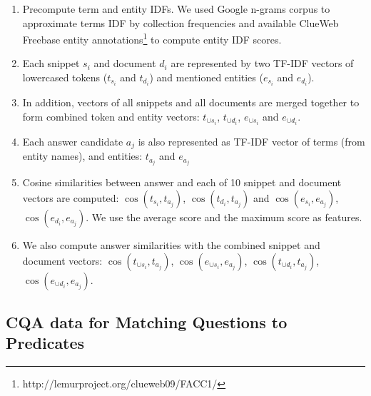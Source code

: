 \begin{enumerate}[noitemsep,topsep=0pt]
\item Precompute term and entity IDFs. We used Google n-grams corpus to approximate terms IDF by collection frequencies and available ClueWeb Freebase entity annotations\footnote{http://lemurproject.org/clueweb09/FACC1/} to compute entity IDF scores.
\item Each snippet $s_i$ and document $d_i$ are represented by two TF-IDF vectors of lowercased tokens ($t_{s_i}$ and $t_{d_i}$) and mentioned entities ($e_{s_i}$ and $e_{d_i}$).
\item In addition, vectors of all snippets and all documents are merged together to form combined token and entity vectors: $t_{\cup s_i}$, $t_{\cup d_i}$, $e_{\cup s_i}$ and $e_{\cup d_i}$.
\item Each answer candidate $a_j$ is also represented as TF-IDF vector of terms (from entity names), and entities: $t_{a_j}$ and $e_{a_j}$
\item Cosine similarities between answer and each of 10 snippet and document vectors are computed: $\cos(t_{s_i}, t_{a_j})$, $\cos(t_{d_i}, t_{a_j})$ and $\cos(e_{s_i}, e_{a_j})$, $\cos(e_{d_i}, e_{a_j})$.
We use the average score and the maximum score as features.
\item We also compute answer similarities with the combined snippet and document vectors: $\cos(t_{\cup s_i}, t_{a_j})$, $\cos(e_{\cup s_i}, e_{a_j})$, $\cos(t_{\cup d_i}, t_{a_j})$, $\cos(e_{\cup d_i}, e_{a_j})$.
\end{enumerate}

\subsection{CQA data for Matching Questions to Predicates}
\label{section:method:cqa}

